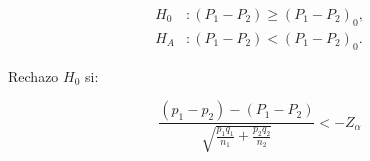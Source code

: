 		\begin{minipage}[b]{\textwidth}
    \begin{minipage}[c]{0.3 \textwidth}\item
    	\begin{align*}
    	H_0&: (P_{1}-P_{2}) \ge (P_{1}-P_{2})_0,\\
    	H_A&: (P_{1}-P_{2}) < (P_{1}-P_{2})_0.    	
    	\end{align*}\end{minipage} \hfill
    \begin{minipage}[c]{0.3 \textwidth}\item
				Rechazo $H_0$ si:		
		\end{minipage} \hfill
    \begin{minipage}[c]{0.3 \textwidth}\item
	 $$\frac { (p_{ 1 }-p_{ 2 })-(P_{ 1 }-P_{ 2 }) }{ \sqrt { \frac { p_{ 1 }q_{ 1 } }{ n_{ 1 } } +\frac { p_{ 2 }q_{ 2 } }{ n_{ 2 } }  }  }  <- Z_{\alpha}$$
    \end{minipage}
    \end{minipage} 